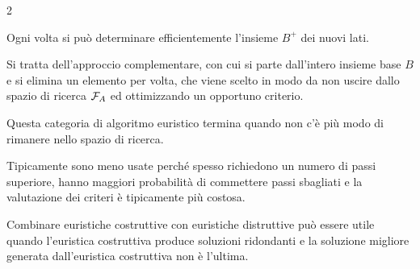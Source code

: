 \documentclass[\main/main.tex]{subfiles}
\begin{document}
\begin{multicols}{2}
\begin{definition}
    Ogni volta si può determinare efficientemente l'insieme \(B^+\) dei nuovi lati.
\end{definition}

\begin{definition}
    Si tratta dell'approccio complementare, con cui si parte dall'intero insieme base \(B\) e si elimina un elemento per volta, che viene scelto in modo da non uscire dallo spazio di ricerca \(\mathcal{F}_A\) ed ottimizzando un opportuno criterio.
\end{definition}
\begin{observation}
    Questa categoria di algoritmo euristico termina quando non c'è più modo di rimanere nello spazio di ricerca.
\end{observation}
\begin{observation}
    Tipicamente sono meno usate perché spesso richiedono un numero di passi superiore, hanno maggiori probabilità di commettere passi sbagliati e la valutazione dei criteri è tipicamente più costosa.
\end{observation}
\begin{observation}
    Combinare euristiche costruttive con euristiche distruttive può essere utile quando l'euristica costruttiva produce soluzioni ridondanti e la soluzione migliore generata dall'euristica costruttiva non è l'ultima.
\end{observation}
\end{multicols}
\end{document}
